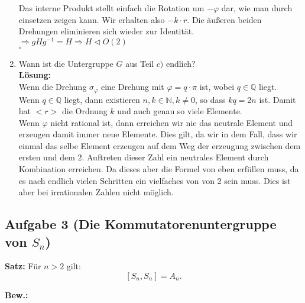 \documentclass[11pt,a4paper,ngerman]{article}
\begin{document}
\begin{enumerate}[\bfseries a)]
Das interne Produkt stellt einfach die Rotation um $- \varphi$ dar, wie man durch einsetzen zeigen kann. Wir erhalten also $-k \cdot r$. Die äußeren beiden Drehungen eliminieren sich wieder zur Identität.\\

$\Rightarrow gHg^{-1} = H \Rightarrow H \vartriangleleft O(2)$ \\
\mbox{} \hfill $\square$

\item Wann ist die Untergruppe $G$ aus Teil $c)$ endlich?\\

\textbf{Lösung:}\\

Wenn die Drehung $\sigma_\varphi$ eine Drehung mit $\varphi = q \cdot \pi$ ist, wobei $q \in \mathbb{Q}$ liegt.\\

Wenn $q \in \mathbb{Q}$ liegt, dann existieren $n,k \in \mathbb{N}, k \not= 0$, so dass $kq = 2n$ ist. Damit hat $<r>$ die Ordnung $k$ und auch genau so viele Elemente.\\

Wenn $\varphi$ nicht rational ist, dann erreichen wir nie das neutrale Element und erzeugen damit immer neue Elemente. Dies gilt, da wir in dem Fall, dass wir einmal das selbe Element erzeugen auf dem Weg der erzeugung zwischen dem ersten und dem 2. Auftreten dieser Zahl ein neutrales Element durch Kombination erreichen. Da dieses aber die Formel von eben erfüllen muss, da es nach endlich vielen Schritten ein vielfaches von von 2 sein muss. Dies ist aber bei irrationalen Zahlen nicht möglich.

\end{enumerate}

\pagebreak


\subsection*{Aufgabe 3 \mdseries (Die Kommutatorenuntergruppe von $S_n$)}

\textbf{Satz:} Für $n>2$ gilt:
$$
\left[ S_n , S_n \right] = A_n.
$$

\textbf{Bew.:}\\
\end{document}
